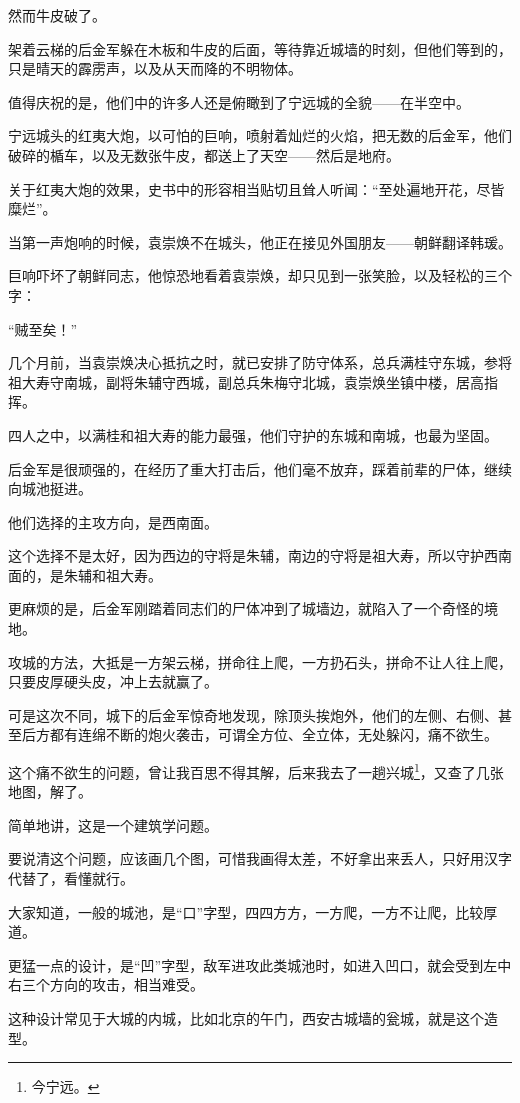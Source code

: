 \begin{multicols}{\theparacolNo}
然而牛皮破了。

架着云梯的后金军躲在木板和牛皮的后面，等待靠近城墙的时刻，但他们等到的，只是晴天的霹雳声，以及从天而降的不明物体。

值得庆祝的是，他们中的许多人还是俯瞰到了宁远城的全貌——在半空中。

宁远城头的红夷大炮，以可怕的巨响，喷射着灿烂的火焰，把无数的后金军，他们破碎的楯车，以及无数张牛皮，都送上了天空——然后是地府。

关于红夷大炮的效果，史书中的形容相当贴切且耸人听闻：“至处遍地开花，尽皆糜烂”。

当第一声炮响的时候，袁崇焕不在城头，他正在接见外国朋友——朝鲜翻译韩瑗。

巨响吓坏了朝鲜同志，他惊恐地看着袁崇焕，却只见到一张笑脸，以及轻松的三个字：

“贼至矣！”

几个月前，当袁崇焕决心抵抗之时，就已安排了防守体系，总兵满桂守东城，参将祖大寿守南城，副将朱辅守西城，副总兵朱梅守北城，袁崇焕坐镇中楼，居高指挥。

四人之中，以满桂和祖大寿的能力最强，他们守护的东城和南城，也最为坚固。

后金军是很顽强的，在经历了重大打击后，他们毫不放弃，踩着前辈的尸体，继续向城池挺进。

他们选择的主攻方向，是西南面。

这个选择不是太好，因为西边的守将是朱辅，南边的守将是祖大寿，所以守护西南面的，是朱辅和祖大寿。

更麻烦的是，后金军刚踏着同志们的尸体冲到了城墙边，就陷入了一个奇怪的境地。

攻城的方法，大抵是一方架云梯，拼命往上爬，一方扔石头，拼命不让人往上爬，只要皮厚硬头皮，冲上去就赢了。

可是这次不同，城下的后金军惊奇地发现，除顶头挨炮外，他们的左侧、右侧、甚至后方都有连绵不断的炮火袭击，可谓全方位、全立体，无处躲闪，痛不欲生。

这个痛不欲生的问题，曾让我百思不得其解，后来我去了一趟兴城\footnote{今宁远。}，又查了几张地图，解了。

简单地讲，这是一个建筑学问题。

要说清这个问题，应该画几个图，可惜我画得太差，不好拿出来丢人，只好用汉字代替了，看懂就行。

大家知道，一般的城池，是“口”字型，四四方方，一方爬，一方不让爬，比较厚道。

更猛一点的设计，是“凹”字型，敌军进攻此类城池时，如进入凹口，就会受到左中右三个方向的攻击，相当难受。

这种设计常见于大城的内城，比如北京的午门，西安古城墙的瓮城，就是这个造型。


\end{multicols}
